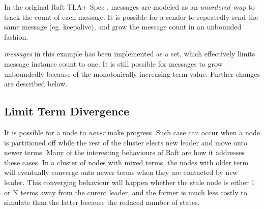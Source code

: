 \documentclass{report}
\begin{document}
In the original Raft TLA+ Spec \cite{raft_tla}, messages are modeled as an
\textit{unordered map} to track the count of each message. It is possible for a
sender to repeatedly send the same message (eg. keepalive), and grow the 
message count in an unbounded fashion.\newline

\textit{messages} in this example has been implemented as a set, which
effectively limits message instance count to one. It is still possible for
messages to grow unboundedly because of the monotonically increasing term value.
Further changes are described below.

\subsection{Limit Term Divergence} 

It is possible for a node to \textit{never} make progress. Such case can occur
when a node is partitioned off while the rest of the cluster elects new leader
and move onto newer terms. Many of the interesting behaviours of Raft are how it
addresses these cases. In a cluster of nodes with mixed terms, the nodes with
older term will eventually converge onto newer terms when they are contacted by
new leader. This converging behaviour will happen whether the stale node is
either 1 or N terms away from the curent leader, and the former is much less
costly to simulate than the latter because the reduced number of states.\newline
\end{document}

